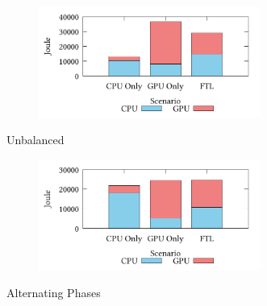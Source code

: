 \documentclass[8pt]{article}
\begin{document}
\setcounter{figure}{1}
\renewcommand{\thefigure}{\arabic{figure}b}
\begin{figure}[!h]
\centering
\begin{subfigure}[b]{\mysize}
\centering
\includegraphics[width=0.8\textwidth]{figures_original/unbalanced.energy.pdf}
\renewcommand{\thesubfigure}{Original}
\caption{}
\end{subfigure}
\begin{subfigure}[b]{\mysize}
\centering
{}
\renewcommand{\thesubfigure}{Reproduced}
\caption{}
\end{subfigure}
\caption{Unbalanced}
\end{figure}



\setcounter{figure}{1}
\renewcommand{\thefigure}{\arabic{figure}c}
\begin{figure}[!h]
\centering
\begin{subfigure}[b]{\mysize}
\centering
\includegraphics[width=0.8\textwidth]{figures_original/alternating.energy.pdf}
\renewcommand{\thesubfigure}{Original}
\caption{}
\end{subfigure}
\begin{subfigure}[b]{\mysize}
\centering
{}
\renewcommand{\thesubfigure}{Reproduced}
\caption{}
\end{subfigure}
\caption{Alternating Phases}
\end{figure}
\end{document}
